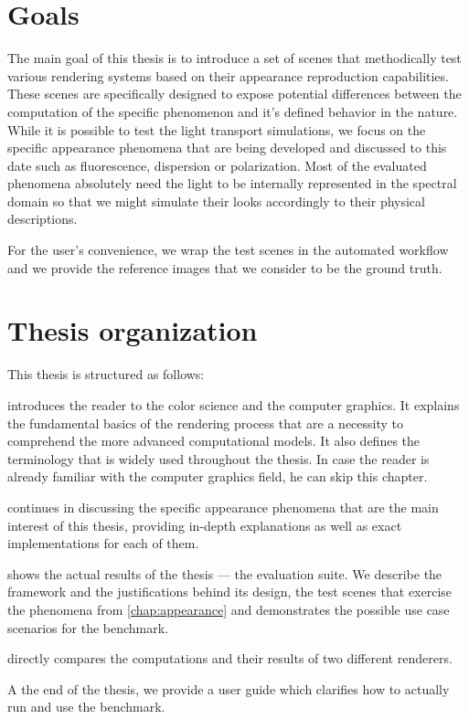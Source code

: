 \section*{Goals}

The main goal of this thesis is to introduce a set of scenes that methodically test various rendering systems based on their appearance reproduction capabilities. These scenes are specifically designed to expose potential differences between the computation of the specific phenomenon and it's defined behavior in the nature. While it is possible to test the light transport simulations, we focus on the specific appearance phenomena that are being developed and discussed to this date such as fluorescence, dispersion or polarization. Most of the evaluated phenomena absolutely need the light to be internally represented in the spectral domain so that we might simulate their looks accordingly to their physical descriptions.

For the user's convenience, we wrap the test scenes in the automated workflow and we provide the reference images that we consider to be the ground truth.

\section*{Thesis organization}

This thesis is structured as follows: 

 introduces the reader to the color science and the computer graphics. It explains the fundamental basics of the rendering process that are a necessity to comprehend the more advanced computational models. It also defines the terminology that is widely used throughout the thesis. In case the reader is already familiar with the computer graphics field, he can skip this chapter. 

 continues in discussing the specific appearance phenomena that are the main interest of this thesis, providing in-depth explanations as well as exact implementations for each of them. 

 shows the actual results of the thesis --- the evaluation suite. We describe the framework and the justifications behind its design, the test scenes that exercise the phenomena from \autoref{chap:appearance} and demonstrates the possible use case scenarios for the benchmark. 

 directly compares the computations and their results of two different renderers.

A the end of the thesis, we provide a user guide which clarifies how to actually run and use the benchmark.

